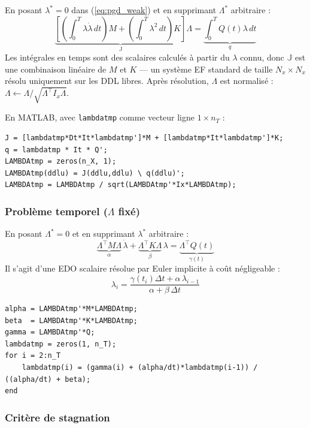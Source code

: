 \documentclass[11pt,a4paper]{article}
\begin{document}
En posant $\lambda^* = 0$ dans (\ref{eq:pgd_weak}) et en supprimant
$\Lambda^*$ arbitraire :
\begin{equation}
    \underbrace{\left[\left(\int_0^T \lambda\dot{\lambda}\,dt\right)M
    + \left(\int_0^T \lambda^2\,dt\right)K\right]}_{\mathbb{J}} \Lambda
    = \underbrace{\int_0^T Q(t)\lambda\,dt}_{q}
    \label{eq:fe_problem}
\end{equation}
Les intégrales en temps sont des scalaires calculés à partir du $\lambda$ connu,
donc $\mathbb{J}$ est une combinaison linéaire de $M$ et $K$ ---
un système EF standard de taille $N_x \times N_x$ résolu uniquement sur les DDL libres.
Après résolution, $\Lambda$ est normalisé :
$\Lambda \leftarrow \Lambda / \sqrt{\Lambda^\top I_x \Lambda}$.

En MATLAB, avec \texttt{lambdatmp} comme vecteur ligne $1 \times n_T$ :
\begin{lstlisting}
J = [lambdatmp*Dt*It*lambdatmp']*M + [lambdatmp*It*lambdatmp']*K;
q = lambdatmp * It * Q';
LAMBDAtmp = zeros(n_X, 1);
LAMBDAtmp(ddlu) = J(ddlu,ddlu) \ q(ddlu)';
LAMBDAtmp = LAMBDAtmp / sqrt(LAMBDAtmp'*Ix*LAMBDAtmp);
\end{lstlisting}

\subsubsection{Problème temporel ($\Lambda$ fixé)}

En posant $\Lambda^* = 0$ et en supprimant $\lambda^*$ arbitraire :
\begin{equation}
    \underbrace{\Lambda^\top M\Lambda}_{\alpha}\,\dot{\lambda}
    + \underbrace{\Lambda^\top K\Lambda}_{\beta}\,\lambda
    = \underbrace{\Lambda^\top Q(t)}_{\gamma(t)}
    \label{eq:ode}
\end{equation}
Il s'agit d'une EDO scalaire résolue par Euler implicite à coût négligeable :
\begin{equation}
    \lambda_i = \frac{\gamma(t_i)\Delta t + \alpha\,\lambda_{i-1}}{\alpha + \beta\,\Delta t}
\end{equation}

\begin{lstlisting}
alpha = LAMBDAtmp'*M*LAMBDAtmp;
beta  = LAMBDAtmp'*K*LAMBDAtmp;
gamma = LAMBDAtmp'*Q;
lambdatmp = zeros(1, n_T);
for i = 2:n_T
    lambdatmp(i) = (gamma(i) + (alpha/dt)*lambdatmp(i-1)) / ((alpha/dt) + beta);
end
\end{lstlisting}

\subsubsection{Critère de stagnation}
\end{document}
